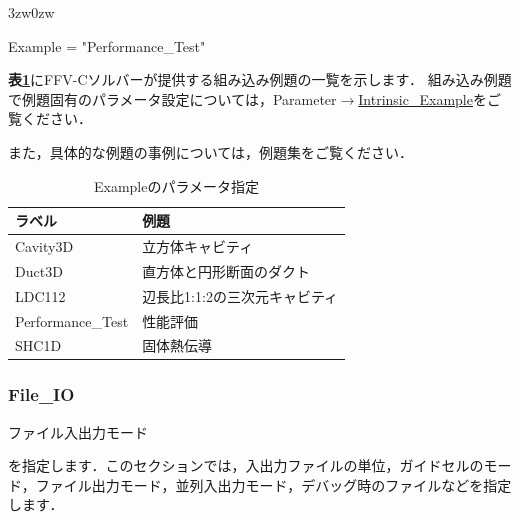 \begin{indentation}{3zw}{0zw}

{\small
\begin{program}
  Example = "Performance_Test"
\end{program}
}

\textbf{表\ref{tbl:intrinsic_example}}にFFV-Cソルバーが提供する組み込み例題の一覧を示します．
組み込み例題で例題固有のパラメータ設定については，Parameter$\to$\hyperlink{tgt:intrinsic_example}{Intrinsic\_Example}をご覧ください．

また，具体的な例題の事例については，例題集をご覧ください．

\begin{table}[htdp]
\caption{Exampleのパラメータ指定}
\begin{center}
\small
\begin{tabular}{ll} \toprule
ラベル & 例題\\ \midrule
Cavity3D & 立方体キャビティ\\
Duct3D & 直方体と円形断面のダクト\\
LDC112 & 辺長比1:1:2の三次元キャビティ\\
Performance\_Test & 性能評価\\
SHC1D & 固体熱伝導\\ \bottomrule
\end{tabular}
\end{center}
\label{tbl:intrinsic_example}
\end{table}

\end{indentation}


\pagebreak
\subsubsection{File\_IO}

\hypertarget{tgt:fileio}{ファイル入出力モード}を指定します．このセクションでは，入出力ファイルの単位，ガイドセルのモード，ファイル出力モード，並列入出力モード，デバッグ時のファイルなどを指定します．

